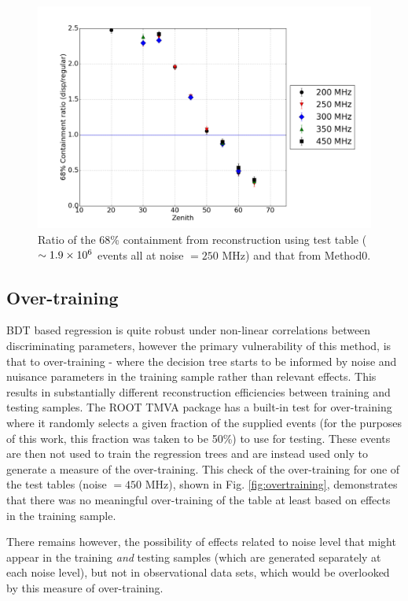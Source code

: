 \documentclass[main.tex]{subfiles}
\begin{document}
\begin{figure}[htbp]
  \centering
  \includegraphics[width=0.8\linewidth]{images/disp_250_ratio_xzen}
  \caption[Test \disp table reconstruction (noise = $250$ MHz).]{Ratio of the 68\% containment from reconstruction using test \disp table ($\sim 1.9\times 10^{6}$ events all at noise $= 250$ MHz) and that from Method0.}
  \label{fig:disp_ratio_250}
\end{figure}

\subsection{Over-training}
BDT based regression is quite robust under non-linear correlations between discriminating parameters, however the primary vulnerability of this method, is that  to over-training - where the decision tree starts to be informed by noise and nuisance parameters in the training sample rather than relevant effects. This results in substantially different reconstruction efficiencies between training and testing samples. The ROOT TMVA package has a built-in test for over-training where it randomly selects a given fraction of the supplied events (for the purposes of this work, this fraction was taken to be 50\%) to use for testing. These events are then not used to train the regression trees and are instead used only to generate a measure of the over-training.
This check of the over-training for one of the test tables (noise $= 450$ MHz), shown in Fig. \ref{fig:overtraining}, demonstrates that there was no meaningful over-training of the table at least based on effects in the training sample.

There remains however, the possibility of effects related to noise level that might appear in the training \textit{and} testing samples (which are generated separately at each noise level), but not in observational data sets, which would be overlooked by this measure of over-training.
\end{document}
